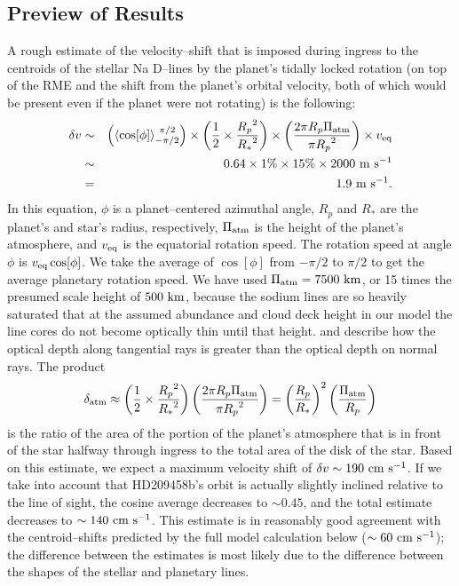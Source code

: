 \documentclass[12pt,preprint]{aastex}
\begin{document}
\subsection{Preview of Results}
\label{ssec:preview}
A rough estimate of the velocity--shift that is imposed during ingress to the
centroids of the stellar Na D--lines by the planet's tidally locked rotation
(on top of the RME and the shift from the planet's orbital velocity, both of
which would be present even if the planet were not rotating) is the following:
\begin{eqnarray}
\nonumber \delta v & \sim &  \left(\left< \cos[\phi] \right>_{-\pi/2}^{~\pi/2}\right) \times \left( \frac{1}{2} \times \frac{{R_p}^2}{{R_*}^2}\right) \times \left( \frac{2 \pi R_p \Pi_{\rm atm}}{\pi {R_p}^2} \right) \times v_{\rm eq} \\
\nonumber & \sim & 0.64 \times 1\% \times 15\% \times 2000 {\rm ~m~s^{-1}} \\
\label{eq:Delta v estimated} & = & 1.9 {\rm ~m~s^{-1}}.
\end{eqnarray}
In this equation, $\phi$ is a planet--centered azimuthal angle,
$R_p$ and $R_*$ are the planet's and star's radius, respectively,
$\Pi_{\rm atm}$ is the height of the planet's atmosphere, and $v_{\rm eq}$
is the equatorial rotation speed.  The rotation speed at angle $\phi$ is
$v_{\rm eq} \cos[\phi]$.  We take the average of $\cos[\phi]$ from
$-\pi/2$ to $\pi/2$ to get the average planetary rotation speed.
We have used $\Pi_{\rm atm} = 7500 {\rm ~km}$, or 15 times the
presumed scale height of $500 {\rm ~km}$, because the sodium lines
are so heavily saturated that at the assumed abundance and cloud deck
height in our model the line cores do not become optically thin until
that height.  \citet{burrows_et_al2004} and \citet{fortney2005} describe
how the optical depth along tangential rays is greater than the optical depth
on normal rays. The product
\[
\delta_{\rm atm} \approx \left( \frac{1}{2} \times \frac{{R_p}^2}{{R_*}^2}\right) \left( \frac{2 \pi R_p \Pi_{\rm atm}}{\pi {R_p}^2} \right) = \left(\frac{R_p}{R_*}\right)^2 \left( \frac{\Pi_{\rm atm}}{R_p} \right)
\]
is the ratio of the area of the portion of the planet's atmosphere that is in
front of the star halfway through ingress to the total area of the disk of the
star.  Based on this estimate, we expect a maximum velocity shift of
$\delta v \sim 190 {\rm ~cm~s^{-1}}$.  If we take into account that HD209458b's
orbit is actually slightly inclined relative to the line of sight, the cosine
average decreases to $\sim 0.45$, and the total estimate decreases to
$\sim 140 {\rm~cm~s^{-1}}$.  This estimate is in reasonably good agreement with
the centroid--shifts predicted by the full model calculation below
($\sim 60 {\rm ~cm~s^{-1}}$); the
difference between the estimates is most likely due to the difference between
the shapes of the stellar and planetary lines.
\end{document}
